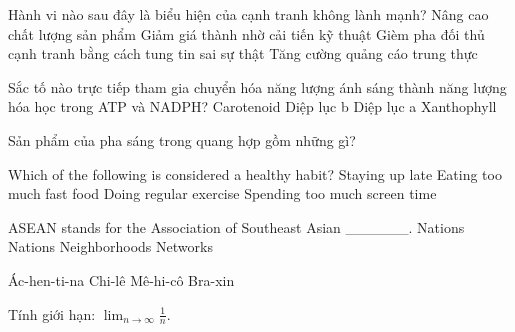 \begin{ex}
    Hành vi nào sau đây là biểu hiện của cạnh tranh không lành mạnh?
    \choice
    {Nâng cao chất lượng sản phẩm}
    {Giảm giá thành nhờ cải tiến kỹ thuật}
    {\True Gièm pha đối thủ cạnh tranh bằng cách tung tin sai sự thật}
    {Tăng cường quảng cáo trung thực}

\end{ex}
\begin{ex}
    Sắc tố nào trực tiếp tham gia chuyển hóa năng lượng ánh sáng thành năng lượng hóa học trong ATP và NADPH?
    \choice
    {Carotenoid}
    {Diệp lục b}
    {\True Diệp lục a}
    {Xanthophyll}

\end{ex}
\begin{ex}
    Sản phẩm của pha sáng trong quang hợp gồm những gì?
\end{ex}
\begin{ex}
    Which of the following is considered a healthy habit?
    \choice
    {Staying up late}
    {Eating too much fast food}
    {\True Doing regular exercise}
    {Spending too much screen time}

\end{ex}
\begin{ex}
    ASEAN stands for the Association of Southeast Asian ______.
    \choice
    {Nations}
    {\True Nations}
    {Neighborhoods}
    {Networks}

\end{ex}
\begin{ex}
    \choice
    {Ác-hen-ti-na}
    {Chi-lê}
    {Mê-hi-cô}
    {\True Bra-xin}

\end{ex}
\begin{ex}
    Tính giới hạn: $\lim_{n \to \infty} \frac{1}{n}$.
\end{ex}
